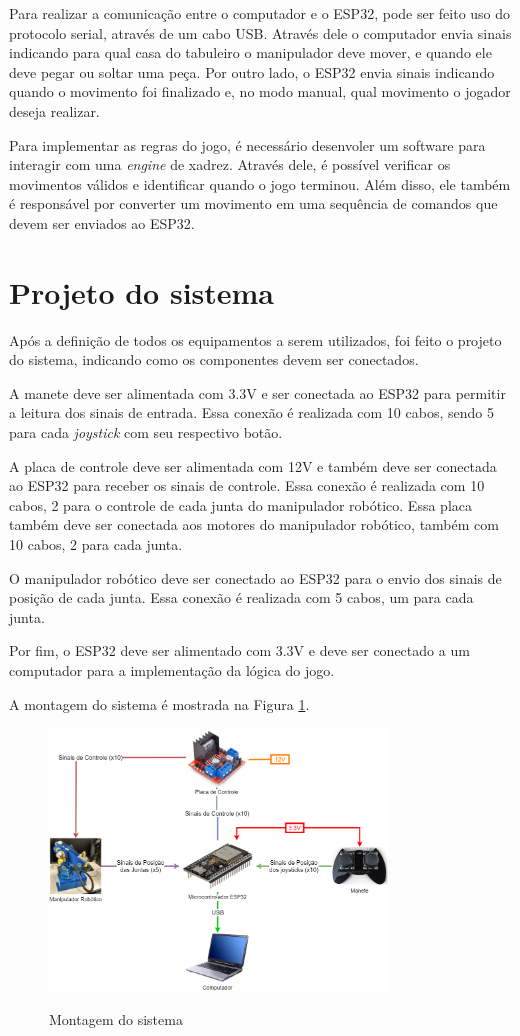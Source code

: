 Para realizar a comunicação entre o computador e o ESP32, pode ser feito uso do protocolo serial, através de um cabo USB.
Através dele o computador envia sinais indicando para qual casa do tabuleiro o manipulador deve mover, e quando ele deve pegar ou soltar uma peça.
Por outro lado, o ESP32 envia sinais indicando quando o movimento foi finalizado e, no modo manual, qual movimento o jogador deseja realizar.

Para implementar as regras do jogo, é necessário desenvoler um software para interagir com uma \textit{engine} de xadrez.
Através dele, é possível verificar os movimentos válidos e identificar quando o jogo terminou.
Além disso, ele também é responsável por converter um movimento em uma sequência de comandos que devem ser enviados ao ESP32.

\section[Projeto do sistema]{Projeto do sistema}
\label{sec:projetoSistema}

Após a definição de todos os equipamentos a serem utilizados, foi feito o projeto do sistema,
indicando como os componentes devem ser conectados.

A manete deve ser alimentada com 3.3V e ser conectada ao ESP32 para permitir a leitura dos sinais de entrada.
Essa conexão é realizada com 10 cabos, sendo 5 para cada \textit{joystick} com seu respectivo botão.

A placa de controle deve ser alimentada com 12V e também deve ser conectada ao ESP32 para receber os sinais de controle.
Essa conexão é realizada com 10 cabos, 2 para o controle de cada junta do manipulador robótico.
Essa placa também deve ser conectada aos motores do manipulador robótico, também com 10 cabos, 2 para cada junta.

O manipulador robótico deve ser conectado ao ESP32 para o envio dos sinais de posição de cada junta.
Essa conexão é realizada com 5 cabos, um para cada junta.

Por fim, o ESP32 deve ser alimentado com 3.3V e deve ser conectado a um computador para a implementação da lógica do jogo.

A montagem do sistema é mostrada na Figura \ref{fig:montagemSistema}.

\begin{figure}[H]
    \centering
    \caption{Montagem do sistema}
    \includegraphics[keepaspectratio=true, width=0.8\textwidth]
    	{img/projeto-sistema.png}
    \label{fig:montagemSistema}
\end{figure}


